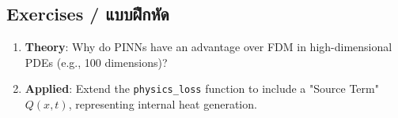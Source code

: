 \subsection{Exercises \quad / \quad \textthai{แบบฝึกหัด}}
\begin{enumerate}
    \item \textbf{Theory}: Why do PINNs have an advantage over FDM in high-dimensional PDEs (e.g., 100 dimensions)?
    \item \textbf{Applied}: Extend the \texttt{physics\_loss} function to include a "Source Term" $Q(x, t)$, representing internal heat generation.
\end{enumerate}
